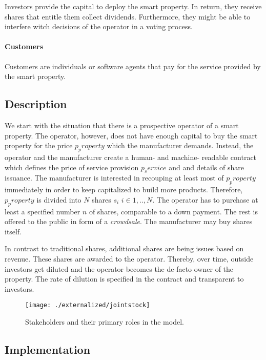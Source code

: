 Investors provide the capital to deploy the smart property. In return, they receive shares that entitle them collect dividends. Furthermore, they might be able to interfere witch decisions of the operator in a voting process.

\paragraph{Customers}

Customers are individuals or software agents that pay for the service provided by the smart property.

\subsection{Description}

We start with the situation that there is a prospective operator of a smart property. The operator, however, does not have enough capital to buy the smart property for the price $p_property$ which the manufacturer demands. Instead, the operator and the manufacturer create a human- and machine- readable contract which defines the price of service provision $p_service$ and and details of share issuance. The manufacturer is interested in recouping at least most of $p_property$ immediately in order to keep capitalized to build more products. Therefore, $p_property$ is divided into $N$ shares $s_i$ $i \in {1,..,N}$. The operator has to purchase at least a specified number $n$ of shares, comparable to a down payment. The rest is offered to the public in form of a \emph{crowdsale}. The manufacturer may buy shares itself. 

In contrast to traditional shares, additional shares are being issues based on revenue. These shares are awarded to the operator. Thereby, over time, outside investors get diluted and the operator becomes the de-facto owner of the property. The rate of dilution is specified in the contract and transparent to investors.

\begin{figure}[!t]
    \centering
    \texttt{[image: ./externalized/jointstock]}
    \caption{Stakeholders and their primary roles in the model.}
    \label{fig:smartproperty}
  \end{figure}

\subsection{Implementation}


